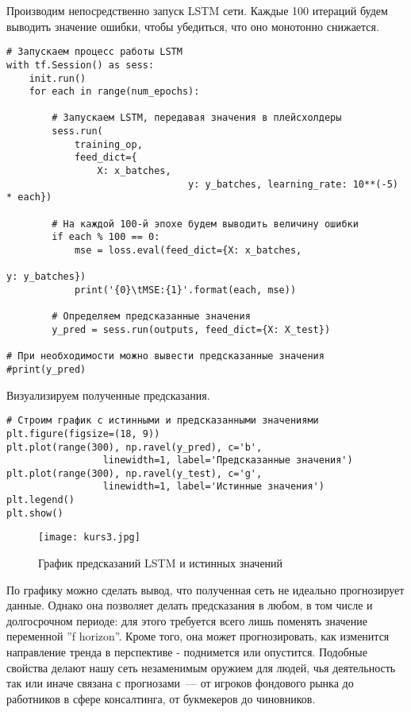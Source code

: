 \documentclass[12pt, a4paper]{article}
\begin{document}
Производим непосредственно запуск LSTM сети. Каждые 100 итераций будем выводить значение ошибки, чтобы убедиться, что оно монотонно снижается.

\begin{verbatim}
# Запускаем процесс работы LSTM
with tf.Session() as sess:
    init.run()
    for each in range(num_epochs):

        # Запускаем LSTM, передавая значения в плейсхолдеры
        sess.run(
            training_op,
            feed_dict={
                X: x_batches,
								y: y_batches, learning_rate: 10**(-5) * each})

        # На каждой 100-й эпохе будем выводить величину ошибки
        if each % 100 == 0:
            mse = loss.eval(feed_dict={X: x_batches,
						 													 y: y_batches})
            print('{0}\tMSE:{1}'.format(each, mse))

        # Определяем предсказанные значения
        y_pred = sess.run(outputs, feed_dict={X: X_test})

# При необходимости можно вывести предсказанные значения
#print(y_pred)
\end{verbatim}

Визуализируем полученные предсказания.

\begin{verbatim}
# Строим график с истинными и предсказанными значениями
plt.figure(figsize=(18, 9))
plt.plot(range(300), np.ravel(y_pred), c='b',
 				 linewidth=1, label='Предсказанные значения')
plt.plot(range(300), np.ravel(y_test), c='g',
 				 linewidth=1, label='Истинные значения')
plt.legend()
plt.show()
\end{verbatim}

\begin{figure}[h]
    \centering
    \texttt{[image: kurs3.jpg]}
		\caption{График предсказаний LSTM и истинных значений}
\end{figure}

По графику можно сделать вывод, что полученная сеть не идеально прогнозирует данные. Однако она позволяет делать предсказания в любом, в том числе и долгосрочном периоде: для этого требуется всего лишь поменять значение переменной ''f horizon''. Кроме того, она может прогнозировать, как изменится направление тренда в перспективе - поднимется или опустится. Подобные свойства делают нашу сеть незаменимым оружием для людей, чья деятельность так или иначе связана с прогнозами~--- от игроков фондового рынка до работников в сфере консалтинга, от букмекеров до чиновников.
\end{document}
